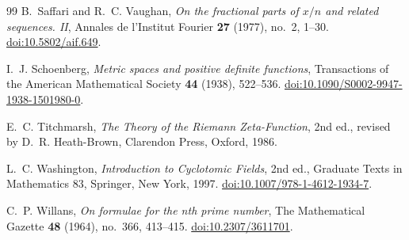 \documentclass[11pt]{amsart}
\numberwithin{equation}{section}
\theoremstyle{definition}
\theoremstyle{remark}
\begin{document}
\begin{thebibliography}{99}
B.~Saffari and R.~C. Vaughan,
\emph{On the fractional parts of \(x/n\) and related sequences. II},
Annales de l'Institut Fourier \textbf{27} (1977), no.~2, 1--30.
\href{https://doi.org/10.5802/aif.649}{doi:10.5802/aif.649}.

I.~J. Schoenberg,
\emph{Metric spaces and positive definite functions},
Transactions of the American Mathematical Society \textbf{44} (1938),
522--536.
\href{https://doi.org/10.1090/S0002-9947-1938-1501980-0}
{doi:10.1090/S0002-9947-1938-1501980-0}.

E.~C. Titchmarsh,
\emph{The Theory of the Riemann Zeta-Function}, 2nd ed.,
revised by D.~R. Heath-Brown, Clarendon Press, Oxford, 1986.

L.~C. Washington,
\emph{Introduction to Cyclotomic Fields}, 2nd ed.,
Graduate Texts in Mathematics 83, Springer, New York, 1997.
\href{https://doi.org/10.1007/978-1-4612-1934-7}
{doi:10.1007/978-1-4612-1934-7}.

C.~P. Willans,
\emph{On formulae for the nth prime number},
The Mathematical Gazette \textbf{48} (1964), no.~366, 413--415.
\href{https://doi.org/10.2307/3611701}{doi:10.2307/3611701}.

\end{thebibliography}
\end{document}
